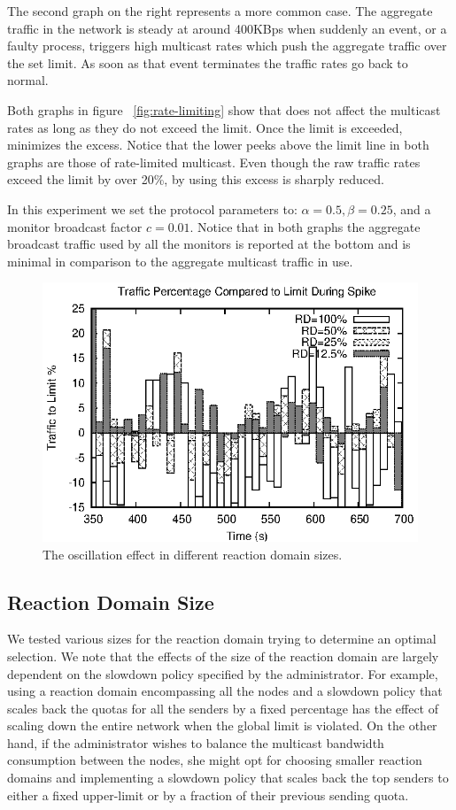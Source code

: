 The second graph on the right represents a more common case. The aggregate traffic in the network is steady at around 400KBps when suddenly an event, or a faulty process, triggers high multicast rates which push the aggregate traffic over the set limit. As soon as that event terminates the traffic rates go back to normal.

Both graphs in figure ~\ref{fig:rate-limiting} show that \sysname{} does not affect the multicast rates as long as they do not exceed the limit. Once the limit is exceeded, \sysname{} minimizes the excess. Notice that the lower peeks above the limit line in both graphs are those of rate-limited multicast. Even though the raw traffic rates exceed the limit by over 20\%, by using \sysname{} this excess is sharply reduced.

In this experiment we set the protocol parameters to: $\alpha=0.5, \beta=0.25$, and a monitor broadcast factor $c=0.01$. Notice that in both graphs the aggregate broadcast traffic used by all the monitors is reported at the bottom and is minimal in comparison to the aggregate multicast traffic in use.

\begin{figure}[t]
 \centering
 \includegraphics[scale=1]{figures/evaluation/rd/reaction-waves.eps}
 \caption{The oscillation effect in different reaction domain sizes.}
 \label{fig:varied-rd}
\end{figure}

\subsection{Reaction Domain Size}
We tested various sizes for the reaction domain trying to determine an optimal selection. We note that the effects of the size of the reaction domain are largely dependent on the slowdown policy specified by the administrator. For example, using a reaction domain encompassing all the nodes and a slowdown policy that scales back the quotas for all the senders by a fixed percentage has the effect of scaling down the entire network when the global limit is violated. On the other hand, if the administrator wishes to balance the multicast bandwidth consumption between the nodes, she might opt for choosing smaller reaction domains and implementing a slowdown policy that scales back the top senders to either a fixed upper-limit or by a fraction of their previous sending quota.

